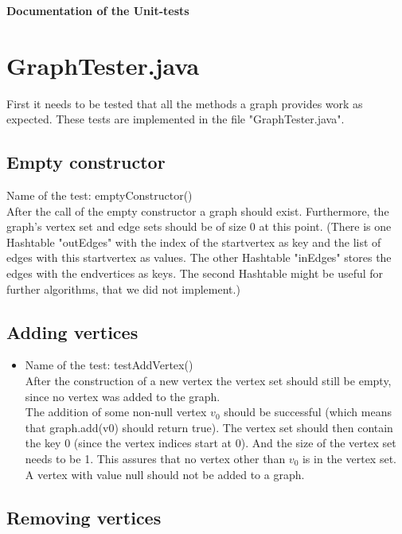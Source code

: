 \documentclass{article}
\begin{document}
\begin{center}
	\textbf{\Huge{Documentation of the Unit-tests}}
\end{center}

\section{GraphTester.java}
First it needs to be tested that all the methods a graph provides work as expected. These tests are implemented in the file "GraphTester.java".
\subsection{Empty constructor}
Name of the test: emptyConstructor() \\
After the call of the empty constructor a graph should exist. Furthermore, the graph's vertex set and edge sets should be of size 0 at this point. (There is one Hashtable "outEdges" with the index of the startvertex as key and the list of edges with this startvertex as values. The other Hashtable "inEdges" stores the edges with the endvertices as keys. The second Hashtable might be useful for further algorithms, that we did not implement.)

\subsection{Adding vertices}
\begin{itemize}
	\item Name of the test: testAddVertex() \\
	After the construction of a new vertex the vertex set should still be empty, since no vertex was added to the graph. \\
	The addition of some non-null vertex $v_0$ should be successful (which means that graph.add(v0) should return true). The vertex set should then contain the key 0 (since the vertex indices start at 0). And the size of the vertex set needs to be 1. This assures that no vertex other than $v_0$ is in the vertex set. \\
	A vertex with value null should not be added to a graph.
\end{itemize}

\subsection{Removing vertices}
\end{document}

